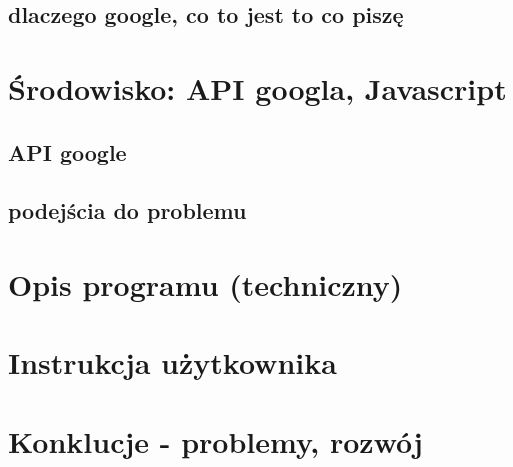 \documentclass[lic,shortabstract]{iithesis}
\begin{document}
\subsection{dlaczego google, co to jest to co piszę}

\section{Środowisko: API googla, Javascript}
\subsection{API google}
\subsection{podejścia do problemu   }
\section{Opis programu (techniczny)}
\section{Instrukcja użytkownika}
\section{Konklucje - problemy, rozwój}

%



\appendix

\end{document}

